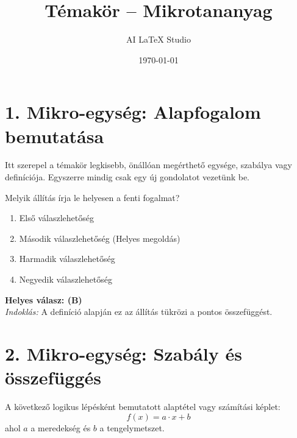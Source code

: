 \documentclass[a4paper,12pt]{article}
\title{Témakör -- Mikrotananyag}
\author{AI LaTeX Studio}
\date{\today}
\begin{document}
\maketitle

\section{1. Mikro-egység: Alapfogalom bemutatása}

\begin{definiciodoboz}
Itt szerepel a témakör legkisebb, önállóan megérthető egysége, szabálya vagy definíciója. Egyszerre mindig csak egy új gondolatot vezetünk be.
\end{definiciodoboz}

\begin{feladatdoboz}
Melyik állítás írja le helyesen a fenti fogalmat?
\begin{enumerate}[label=(\Alph*)]
    \item Első válaszlehetőség
    \item Második válaszlehetőség (Helyes megoldás)
    \item Harmadik válaszlehetőség
    \item Negyedik válaszlehetőség
\end{enumerate}
\end{feladatdoboz}

\begin{megoldasdoboz}
\textbf{Helyes válasz: (B)} \\
\textit{Indoklás:} A definíció alapján ez az állítás tükrözi a pontos összefüggést.
\end{megoldasdoboz}

\section{2. Mikro-egység: Szabály és összefüggés}

\begin{teteldoboz}
A következő logikus lépésként bemutatott alaptétel vagy számítási képlet:
\[
    f(x) = a \cdot x + b
\]
ahol $a$ a meredekség és $b$ a tengelymetszet.
\end{teteldoboz}
\end{document}
